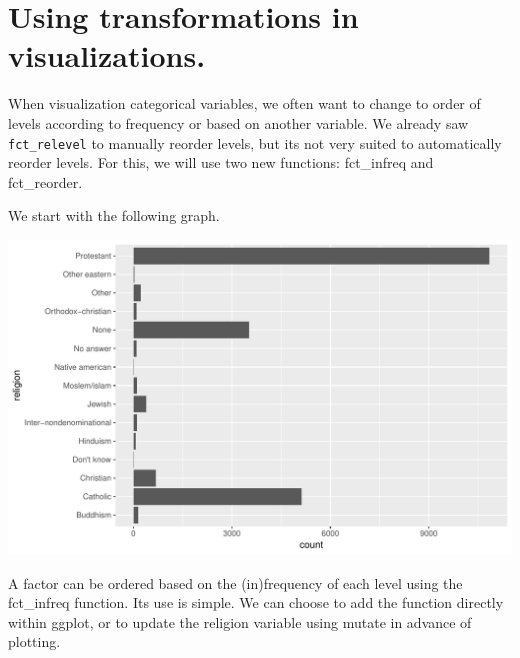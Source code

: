 \documentclass[]{tufte-book}
\newenvironment{Shaded}{}{}
\newcommand{\KeywordTok}[1]{\textcolor[rgb]{0.00,0.44,0.13}{\textbf{#1}}}
\newcommand{\StringTok}[1]{\textcolor[rgb]{0.25,0.44,0.63}{#1}}
\newcommand{\OperatorTok}[1]{\textcolor[rgb]{0.40,0.40,0.40}{#1}}
\newcommand{\NormalTok}[1]{#1}
\begin{document}
\chapter{Using transformations in
visualizations.}\label{using-transformations-in-visualizations.}

When visualization categorical variables, we often want to change to
order of levels according to frequency or based on another variable. We
already saw \texttt{fct\_relevel} to manually reorder levels, but its
not very suited to automatically reorder levels. For this, we will use
two new functions: fct\_infreq and fct\_reorder.

We start with the following graph.

\begin{Shaded}
\end{Shaded}

\includegraphics{cleaning_tutorial_files/figure-latex/unnamed-chunk-80-1}

A factor can be ordered based on the (in)frequency of each level using
the fct\_infreq function. Its use is simple. We can choose to add the
function directly within ggplot, or to update the religion variable
using mutate in advance of plotting.

\begin{Shaded}
\end{Shaded}
\end{document}
